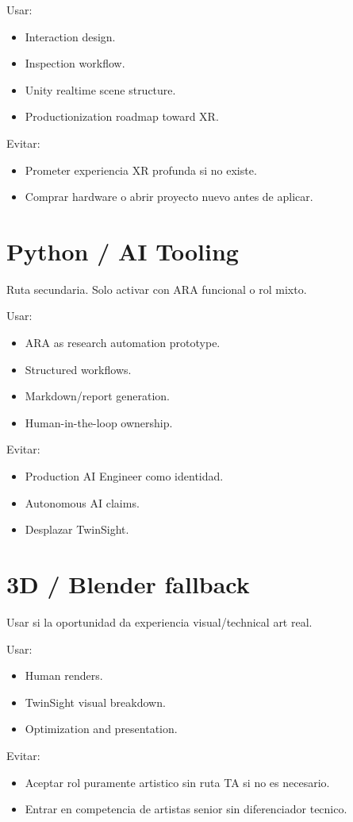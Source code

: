 Usar:


\begin{itemize}
\item Interaction design.
\item Inspection workflow.
\item Unity realtime scene structure.
\item Productionization roadmap toward XR.
\end{itemize}


Evitar:


\begin{itemize}
\item Prometer experiencia XR profunda si no existe.
\item Comprar hardware o abrir proyecto nuevo antes de aplicar.
\end{itemize}


\section{Python / AI Tooling}


Ruta secundaria. Solo activar con ARA funcional o rol mixto.


Usar:


\begin{itemize}
\item ARA as research automation prototype.
\item Structured workflows.
\item Markdown/report generation.
\item Human-in-the-loop ownership.
\end{itemize}


Evitar:


\begin{itemize}
\item Production AI Engineer como identidad.
\item Autonomous AI claims.
\item Desplazar TwinSight.
\end{itemize}


\section{3D / Blender fallback}


Usar si la oportunidad da experiencia visual/technical art real.


Usar:


\begin{itemize}
\item Human renders.
\item TwinSight visual breakdown.
\item Optimization and presentation.
\end{itemize}


Evitar:


\begin{itemize}
\item Aceptar rol puramente artistico sin ruta TA si no es necesario.
\item Entrar en competencia de artistas senior sin diferenciador tecnico.
\end{itemize}
